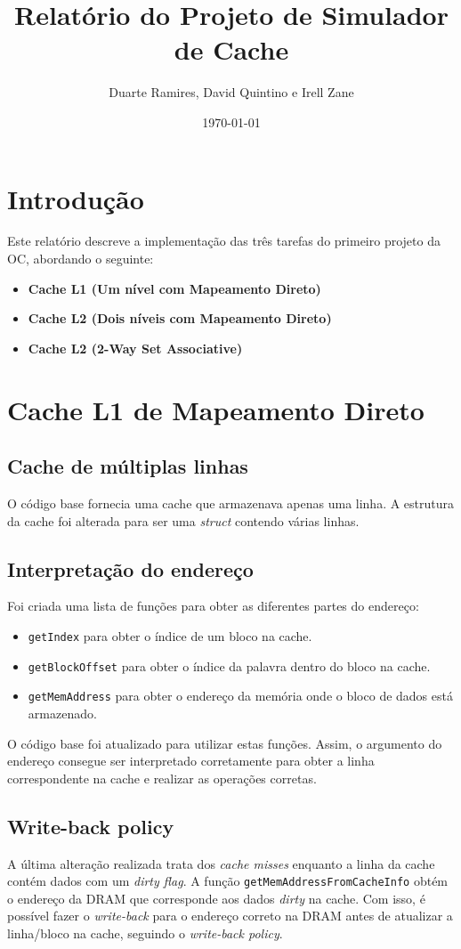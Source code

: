\documentclass{article}
\title{Relatório do Projeto de Simulador de Cache}
\author{Duarte Ramires, David Quintino e Irell Zane}
\date{\today}
\begin{document}
\maketitle

\section{Introdução}
Este relatório descreve a implementação das três tarefas do primeiro projeto da OC, abordando o seguinte:

\begin{itemize}
    \item \textbf{Cache L1 (Um nível com Mapeamento Direto)}
    \item \textbf{Cache L2 (Dois níveis com Mapeamento Direto)}
    \item \textbf{Cache L2 (2-Way Set Associative)}
\end{itemize}

\section{Cache L1 de Mapeamento Direto}
\subsection{Cache de múltiplas linhas}
O código base fornecia uma cache que armazenava apenas uma linha. A estrutura da cache foi alterada para ser uma \textit{struct} contendo várias linhas. 

\subsection{Interpretação do endereço}

Foi criada uma lista de funções para obter as diferentes partes do endereço:
\begin{itemize}
    \item \texttt{getIndex} para obter o índice de um bloco na cache.
    \item \texttt{getBlockOffset} para obter o índice da palavra dentro do bloco na cache.
    \item \texttt{getMemAddress} para obter o endereço da memória onde o bloco de dados está armazenado.
\end{itemize}

O código base foi atualizado para utilizar estas funções. Assim, o argumento do endereço consegue ser interpretado corretamente para obter a linha correspondente na cache e realizar as operações corretas.

\subsection{Write-back policy}

A última alteração realizada trata dos \textit{cache misses} enquanto a linha da cache contém dados com um \textit{dirty flag}. A função \texttt{getMemAddressFromCacheInfo} obtém o endereço da DRAM que corresponde aos dados \textit{dirty} na cache. Com isso, é possível fazer o \textit{write-back} para o endereço correto na DRAM antes de atualizar a linha/bloco na cache, seguindo o \textit{write-back policy}.
\end{document}
